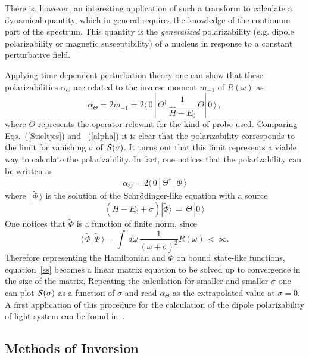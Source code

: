 There is, however, an interesting application of such a transform to calculate a dynamical quantity, which in general requires  the 
knowledge of the continuum part of the spectrum. This quantity is the {\it generalized} polarizability (e.g. dipole polarizability
or magnetic susceptibility)  of a nucleus in response to
a constant perturbative field.  

Applying time dependent perturbation theory one can show that these polarizabilities $\alpha_\Theta$
are related to the inverse moment $m_{-1}$ of $R(\omega)$ as
\begin{equation}\label{alpha}
\alpha_\Theta=2 m_{-1}= 2 \langle\,0\,|\,\Theta^\dagger\, \frac{1}{\hat H -E_0}\,\Theta|\,0\,\rangle\,,
\end{equation}
where $\Theta$ represents the operator relevant for the kind of probe used.
Comparing Eqs.~(\ref{Stieltjes}) and ~(\ref{alpha}) it is clear that the polarizability corresponds to the limit for vanishing $\sigma$
  of  ${\cal S}(\sigma)$. It turns out that this limit represents a viable way to calculate the polarizability. In fact, one notices that
the polarizability can be written as
\begin{equation}
\alpha_\Theta=  2 \langle\,0\,|\,\Theta^\dagger\, |\,\tilde\Phi\,\rangle 
\end{equation}
where $|\,\tilde\Phi\,\rangle$  is the solution of the Schr\"odinger-like  equation  with a source
\begin{equation}\label{ss}
({\hat H -E_0+\sigma})|\tilde\Phi\rangle\,=\,\Theta\,|0\,\rangle
\end{equation} 
One notices that $\tilde\Phi$ is  a function of finite norm, since
\begin{equation}
\langle\,\tilde\Phi|\,\tilde\Phi\,\rangle= \int\,d\omega \,\frac{1}{(\omega+\sigma)^2} R(\omega)\,<\,\infty.
\end{equation}
Therefore  representing the Hamiltonian and $\tilde\Phi$  on bound state-like functions,  equation~\ref{ss} becomes a linear 
matrix equation
to be solved up to convergence in the size of the matrix. Repeating the calculation  for smaller and smaller $\sigma$ 
one can plot $\cal S(\sigma)$ as a function of $\sigma$ and read $\alpha_\Theta$ as the extrapolated value at $\sigma=0$.
A first application of this procedure for the calculation of the dipole polarizability of light system can be found in~\cite{Miorelli_2016}.

\subsection{Methods of Inversion}\label{sec:INV}

